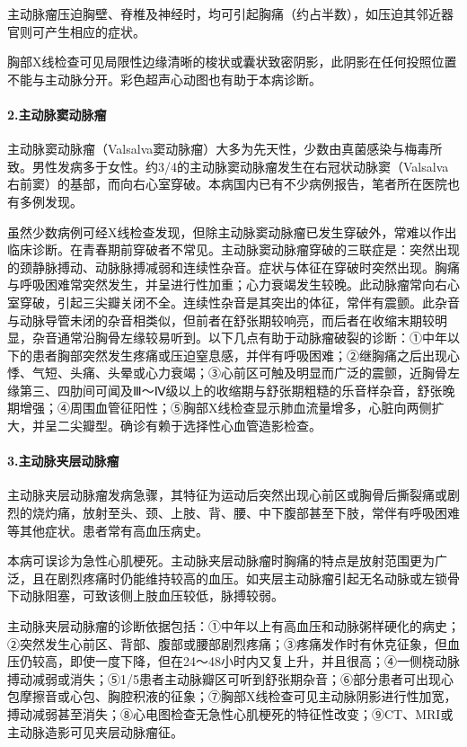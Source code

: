 主动脉瘤压迫胸壁、脊椎及神经时，均可引起胸痛（约占半数），如压迫其邻近器官则可产生相应的症状。

胸部X线检查可见局限性边缘清晰的梭状或囊状致密阴影，此阴影在任何投照位置不能与主动脉分开。彩色超声心动图也有助于本病诊断。

\paragraph{2.主动脉窦动脉瘤}

主动脉窦动脉瘤（Valsalva窦动脉瘤）大多为先天性，少数由真菌感染与梅毒所致。男性发病多于女性。约3/4的主动脉窦动脉瘤发生在右冠状动脉窦（Valsalva右前窦）的基部，而向右心室穿破。本病国内已有不少病例报告，笔者所在医院也有多例发现。

虽然少数病例可经X线检查发现，但除主动脉窦动脉瘤已发生穿破外，常难以作出临床诊断。在青春期前穿破者不常见。主动脉窦动脉瘤穿破的三联症是：突然出现的颈静脉搏动、动脉脉搏减弱和连续性杂音。症状与体征在穿破时突然出现。胸痛与呼吸困难常突然发生，并呈进行性加重；心力衰竭发生较晚。此动脉瘤常向右心室穿破，引起三尖瓣关闭不全。连续性杂音是其突出的体征，常伴有震颤。此杂音与动脉导管未闭的杂音相类似，但前者在舒张期较响亮，而后者在收缩末期较明显，杂音通常沿胸骨左缘较易听到。以下几点有助于动脉瘤破裂的诊断：①中年以下的患者胸部突然发生疼痛或压迫窒息感，并伴有呼吸困难；②继胸痛之后出现心悸、气短、头痛、头晕或心力衰竭；③心前区可触及明显而广泛的震颤，近胸骨左缘第三、四肋间可闻及Ⅲ～Ⅳ级以上的收缩期与舒张期粗糙的乐音样杂音，舒张晚期增强；④周围血管征阳性；⑤胸部X线检查显示肺血流量增多，心脏向两侧扩大，并呈二尖瓣型。确诊有赖于选择性心血管造影检查。

\paragraph{3.主动脉夹层动脉瘤}

主动脉夹层动脉瘤发病急骤，其特征为运动后突然出现心前区或胸骨后撕裂痛或剧烈的烧灼痛，放射至头、颈、上肢、背、腰、中下腹部甚至下肢，常伴有呼吸困难等其他症状。患者常有高血压病史。

本病可误诊为急性心肌梗死。主动脉夹层动脉瘤时胸痛的特点是放射范围更为广泛，且在剧烈疼痛时仍能维持较高的血压。如夹层主动脉瘤引起无名动脉或左锁骨下动脉阻塞，可致该侧上肢血压较低，脉搏较弱。

主动脉夹层动脉瘤的诊断依据包括：①中年以上有高血压和动脉粥样硬化的病史；②突然发生心前区、背部、腹部或腰部剧烈疼痛；③疼痛发作时有休克征象，但血压仍较高，即使一度下降，但在24～48小时内又复上升，并且很高；④一侧桡动脉搏动减弱或消失；⑤1/5患者主动脉瓣区可听到舒张期杂音；⑥部分患者可出现心包摩擦音或心包、胸腔积液的征象；⑦胸部X线检查可见主动脉阴影进行性加宽，搏动减弱甚至消失；⑧心电图检查无急性心肌梗死的特征性改变；⑨CT、MRI或主动脉造影可见夹层动脉瘤征。

